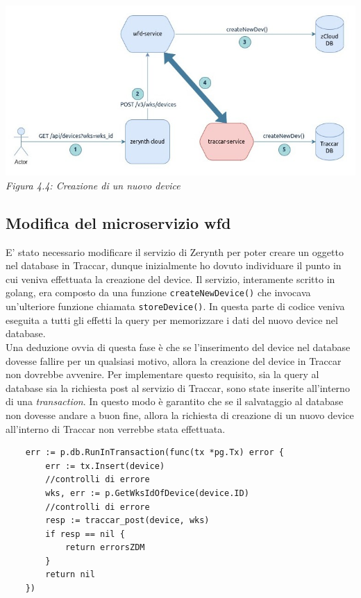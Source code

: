 \documentclass[a4paper,titlepage,12pt]{report}
\begin{document}
{\begin{center}
\includegraphics[scale=0.58]{images/dev_create.jpg}\\ 
\textit{Figura 4.4: Creazione di un nuovo device}
\end{center}

\subsection{
Modifica del microservizio wfd}
E' stato necessario modificare il servizio di Zerynth per poter creare un oggetto nel database in Traccar, dunque inizialmente ho dovuto individuare il punto in cui veniva effettuata la creazione del device. Il servizio, interamente scritto in golang, era composto da una funzione \texttt{createNewDevice()} che invocava un'ulteriore funzione chiamata \texttt{storeDevice()}. In questa parte di codice veniva eseguita a tutti gli effetti la query per memorizzare i dati del nuovo device nel database.\\
Una deduzione ovvia di questa fase è che se l'inserimento del device nel database dovesse fallire per un qualsiasi motivo, allora la creazione del device in Traccar non dovrebbe avvenire. Per implementare questo requisito, sia la query al database sia la richiesta post al servizio di Traccar, sono state inserite all'interno di una \textit{transaction}. In questo modo è garantito che se il salvataggio al database non dovesse andare a buon fine, allora la richiesta di creazione di un nuovo device all'interno di Traccar non verrebbe stata effettuata.
\newpage
\begin{verbatim}
	err := p.db.RunInTransaction(func(tx *pg.Tx) error {
		err := tx.Insert(device) 
		//controlli di errore
		wks, err := p.GetWksIdOfDevice(device.ID)
		//controlli di errore
		resp := traccar_post(device, wks)
		if resp == nil {
			return errorsZDM
		}
		return nil
	})



\end{verbatim}}
\end{document}
